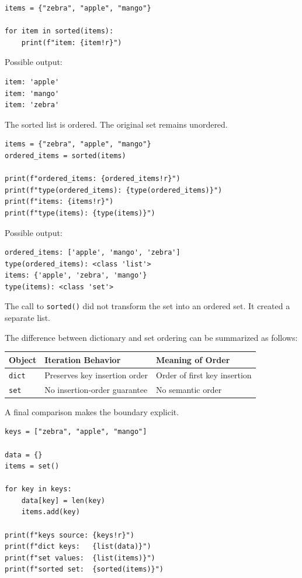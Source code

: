 \begin{verbatim}
items = {"zebra", "apple", "mango"}

for item in sorted(items):
    print(f"item: {item!r}")
\end{verbatim}

Possible output:

\begin{verbatim}
item: 'apple'
item: 'mango'
item: 'zebra'
\end{verbatim}

The sorted list is ordered. The original set remains unordered.

\begin{verbatim}
items = {"zebra", "apple", "mango"}
ordered_items = sorted(items)

print(f"ordered_items: {ordered_items!r}")
print(f"type(ordered_items): {type(ordered_items)}")
print(f"items: {items!r}")
print(f"type(items): {type(items)}")
\end{verbatim}

Possible output:

\begin{verbatim}
ordered_items: ['apple', 'mango', 'zebra']
type(ordered_items): <class 'list'>
items: {'apple', 'zebra', 'mango'}
type(items): <class 'set'>
\end{verbatim}

The call to \texttt{sorted()} did not transform the set into an ordered set. It created a separate list.

The difference between dictionary and set ordering can be summarized as follows:

\begin{center}
\begin{tabular}{lll}
\textbf{Object} & \textbf{Iteration Behavior} & \textbf{Meaning of Order} \\
\hline
\texttt{dict} & Preserves key insertion order & Order of first key insertion \\
\texttt{set} & No insertion-order guarantee & No semantic order \\
\end{tabular}
\end{center}

A final comparison makes the boundary explicit.

\begin{verbatim}
keys = ["zebra", "apple", "mango"]

data = {}
items = set()

for key in keys:
    data[key] = len(key)
    items.add(key)

print(f"keys source: {keys!r}")
print(f"dict keys:   {list(data)}")
print(f"set values:  {list(items)}")
print(f"sorted set:  {sorted(items)}")
\end{verbatim}


